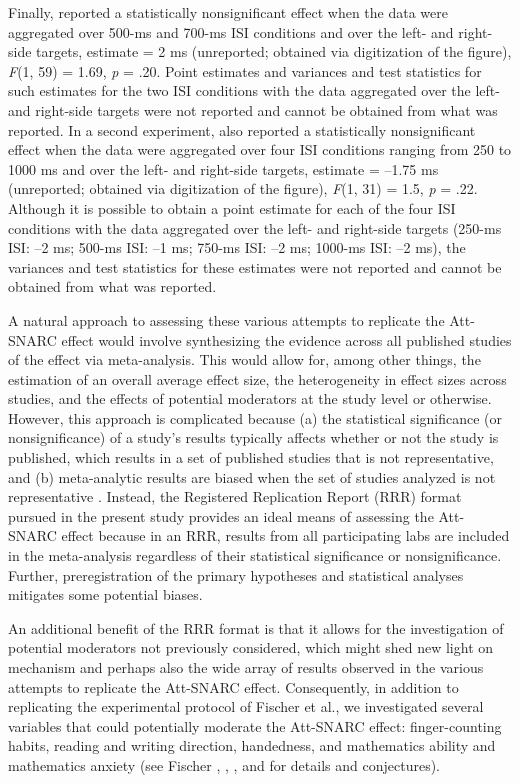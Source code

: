 \documentclass[man,floatsintext]{apa6}
\theoremstyle{definition}
\theoremstyle{definition}
\theoremstyle{definition}
\theoremstyle{remark}
\begin{document}
Finally, \textcite{Fattorini2015} reported a statistically
nonsignificant effect when the data were aggregated over 500-ms and
700-ms ISI conditions and over the left- and right-side targets,
estimate = 2 ms (unreported; obtained via digitization of the figure),
\emph{F}(1, 59) = 1.69, \emph{p} = .20. Point estimates and variances
and test statistics for such estimates for the two ISI conditions with
the data aggregated over the left- and right-side targets were not
reported and cannot be obtained from what was reported. In a second
experiment, \textcite{Fattorini2015} also reported a statistically
nonsignificant effect when the data were aggregated over four ISI
conditions ranging from 250 to 1000 ms and over the left- and right-side
targets, estimate = --1.75 ms (unreported; obtained via digitization of
the figure), \emph{F}(1, 31) = 1.5, \emph{p} = .22. Although it is
possible to obtain a point estimate for each of the four ISI conditions
with the data aggregated over the left- and right-side targets (250-ms
ISI: --2 ms; 500-ms ISI: --1 ms; 750-ms ISI: --2 ms; 1000-ms ISI: --2
ms), the variances and test statistics for these estimates were not
reported and cannot be obtained from what was reported.

A natural approach to assessing these various attempts to replicate the
Att-SNARC effect would involve synthesizing the evidence across all
published studies of the effect via meta-analysis. This would allow for,
among other things, the estimation of an overall average effect size,
the heterogeneity in effect sizes across studies, and the effects of
potential moderators at the study level or otherwise. However, this
approach is complicated because (a) the statistical significance (or
nonsignificance) of a study's results typically affects whether or not
the study is published, which results in a set of published studies that
is not representative, and (b) meta-analytic results are biased when the
set of studies analyzed is not representative
\autocites{McSBocHan16}{ioannidis:eff}. Instead, the Registered
Replication Report (RRR) format pursued in the present study provides an
ideal means of assessing the Att-SNARC effect because in an RRR, results
from all participating labs are included in the meta-analysis regardless
of their statistical significance or nonsignificance. Further,
preregistration of the primary hypotheses and statistical analyses
mitigates some potential biases.

An additional benefit of the RRR format is that it allows for the
investigation of potential moderators not previously considered, which
might shed new light on mechanism and perhaps also the wide array of
results observed in the various attempts to replicate the Att-SNARC
effect. Consequently, in addition to replicating the experimental
protocol of Fischer et al., we investigated several variables that could
potentially moderate the Att-SNARC effect: finger-counting habits,
reading and writing direction, handedness, and mathematics ability and
mathematics anxiety (see Fischer
\autocites{Fischer:2006er}{Fischer:2008bv}, \textcite{Fischer:2014kz},
\textcite{Georges:2016gn}, and \textcite{Shaki:2009ch} for details and
conjectures).
\end{document}
